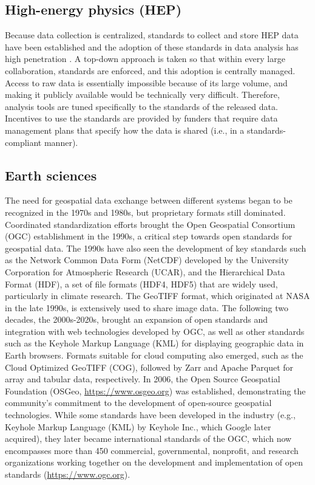 \documentclass[
  number]{elsarticle}
\begin{document}
\subsection{High-energy physics (HEP)}\label{high-energy-physics-hep}

Because data collection is centralized, standards to collect and store
HEP data have been established and the adoption of these standards in
data analysis has high penetration \citep{Basaglia2023-dq}. A top-down
approach is taken so that within every large collaboration, standards
are enforced, and this adoption is centrally managed. Access to raw data
is essentially impossible because of its large volume, and making it
publicly available would be technically very difficult. Therefore,
analysis tools are tuned specifically to the standards of the released
data. Incentives to use the standards are provided by funders that
require data management plans that specify how the data is shared (i.e.,
in a standards-compliant manner).

\subsection{Earth sciences}\label{earth-sciences}

The need for geospatial data exchange between different systems began to
be recognized in the 1970s and 1980s, but proprietary formats still
dominated. Coordinated standardization efforts brought the Open
Geospatial Consortium (OGC) establishment in the 1990s, a critical step
towards open standards for geospatial data. The 1990s have also seen the
development of key standards such as the Network Common Data Form
(NetCDF) developed by the University Corporation for Atmospheric
Research (UCAR), and the Hierarchical Data Format (HDF), a set of file
formats (HDF4, HDF5) that are widely used, particularly in climate
research. The GeoTIFF format, which originated at NASA in the late
1990s, is extensively used to share image data. The following two
decades, the 2000s-2020s, brought an expansion of open standards and
integration with web technologies developed by OGC, as well as other
standards such as the Keyhole Markup Language (KML) for displaying
geographic data in Earth browsers. Formats suitable for cloud computing
also emerged, such as the Cloud Optimized GeoTIFF (COG), followed by
Zarr and Apache Parquet for array and tabular data, respectively. In
2006, the Open Source Geospatial Foundation (OSGeo,
\url{https://www.osgeo.org}) was established, demonstrating the
community's commitment to the development of open-source geospatial
technologies. While some standards have been developed in the industry
(e.g., Keyhole Markup Language (KML) by Keyhole Inc., which Google later
acquired), they later became international standards of the OGC, which
now encompasses more than 450 commercial, governmental, nonprofit, and
research organizations working together on the development and
implementation of open standards (\url{https://www.ogc.org}).
\end{document}
